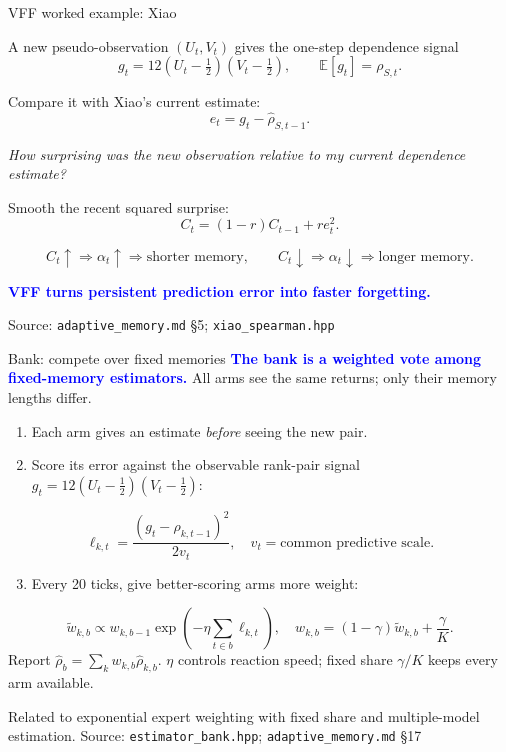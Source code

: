 \documentclass[aspectratio=169,11pt]{beamer}
\newcommand{\good}[1]{\textcolor{blue}{\textbf{#1}}}
\newcommand{\src}[1]{\vfill{\tiny\color{gray}Source: #1}}
\begin{document}
\begin{frame}{VFF worked example: Xiao}

  A new pseudo-observation $(U_t,V_t)$ gives the one-step dependence signal
  \[
    g_t
      =12\left(U_t-\tfrac12\right)
          \left(V_t-\tfrac12\right),
    \qquad
    \mathbb E[g_t]=\rho_{S,t}.
  \]

  Compare it with Xiao's current estimate:
  \[
    e_t=g_t-\widehat\rho_{S,t-1}.
  \]

  \begin{center}
    \emph{How surprising was the new observation relative to my
    current dependence estimate?}
  \end{center}

  Smooth the recent squared surprise:
  \[
    C_t=(1-r)C_{t-1}+r e_t^2.
  \]

  \[
    C_t\uparrow
    \Rightarrow
    \alpha_t\uparrow
    \Rightarrow
    \text{shorter memory},
    \qquad
    C_t\downarrow
    \Rightarrow
    \alpha_t\downarrow
    \Rightarrow
    \text{longer memory}.
  \]

  \good{VFF turns persistent prediction error into faster forgetting.}

  \src{\texttt{adaptive\_memory.md} \S5;
       \texttt{xiao\_spearman.hpp}}
\end{frame}

\begin{frame}{Bank: compete over fixed memories}
  \good{The bank is a weighted vote among fixed-memory estimators.}
  All arms see the same returns; only their memory lengths differ.
  \begin{enumerate}
    \item Each arm gives an estimate \emph{before} seeing the new pair.
    \item Score its error against the observable rank-pair signal
    $g_t=12(U_t-\tfrac12)(V_t-\tfrac12)$:
  \end{enumerate}
  \[
    \ell_{k,t}=\frac{(g_t-\widehat\rho_{k,t-1})^2}{2v_t},
    \quad v_t=\text{common predictive scale}.
  \]
  \begin{enumerate}\setcounter{enumi}{2}
    \item Every 20 ticks, give better-scoring arms more weight:
  \end{enumerate}
  \[
    \widetilde w_{k,b}\propto w_{k,b-1}
    \exp\!\left(-\eta\sum_{t\in b}\ell_{k,t}\right),\quad
    w_{k,b}=(1-\gamma)\widetilde w_{k,b}+\frac\gamma K.
  \]
  Report $\widehat\rho_b=\sum_k w_{k,b}\widehat\rho_{k,b}$.
  $\eta$ controls reaction speed; fixed share $\gamma/K$ keeps every arm available.
  \par\tiny Related to exponential expert weighting with fixed share and multiple-model estimation.
  \src{\texttt{estimator\_bank.hpp}; \texttt{adaptive\_memory.md} \S17}
\end{frame}
\end{document}
